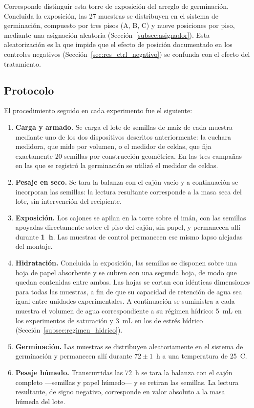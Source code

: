 Corresponde distinguir esta torre de exposición del arreglo de germinación. Concluida la exposición, las 27 muestras se distribuyen en el sistema de germinación, compuesto por tres pisos (A, B, C) y nueve posiciones por piso, mediante una asignación aleatoria (Sección~\ref{subsec:asignador}). Esta aleatorización es la que impide que el efecto de posición documentado en los controles negativos (Sección~\ref{sec:res_ctrl_negativo}) se confunda con el efecto del tratamiento.

\subsection{Protocolo}

El procedimiento seguido en cada experimento fue el siguiente:

\begin{enumerate}
    \item \textbf{Carga y armado.} Se carga el lote de semillas de maíz de cada muestra mediante uno de los dos dispositivos descritos anteriormente: la cuchara medidora, que mide por volumen, o el medidor de celdas, que fija exactamente 20 semillas por construcción geométrica. En las tres campañas en las que se registró la germinación se utilizó el medidor de celdas.
    \item \textbf{Pesaje en seco.} Se tara la balanza con el cajón vacío y a continuación se incorporan las semillas: la lectura resultante corresponde a la masa seca del lote, sin intervención del recipiente.
    \item \textbf{Exposición.} Los cajones se apilan en la torre sobre el imán, con las semillas apoyadas directamente sobre el piso del cajón, sin papel, y permanecen allí durante \textbf{1~h}. Las muestras de control permanecen ese mismo lapso alejadas del montaje.
    \item \textbf{Hidratación.} Concluida la exposición, las semillas se disponen sobre una hoja de papel absorbente y se cubren con una segunda hoja, de modo que quedan contenidas entre ambas. Las hojas se cortan con idénticas dimensiones para todas las muestras, a fin de que su capacidad de retención de agua sea igual entre unidades experimentales. A continuación se suministra a cada muestra el volumen de agua correspondiente a su régimen hídrico: 5~mL en los experimentos de saturación y 3~mL en los de estrés hídrico (Sección~\ref{subsec:regimen_hidrico}).
    \item \textbf{Germinación.} Las muestras se distribuyen aleatoriamente en el sistema de germinación y permanecen allí durante \(72 \pm 1\)~h a una temperatura de 25~\textdegree C.
    \item \textbf{Pesaje húmedo.} Transcurridas las 72~h se tara la balanza con el cajón completo ---semillas y papel húmedo--- y se retiran las semillas. La lectura resultante, de signo negativo, corresponde en valor absoluto a la masa húmeda del lote.
\end{enumerate}

